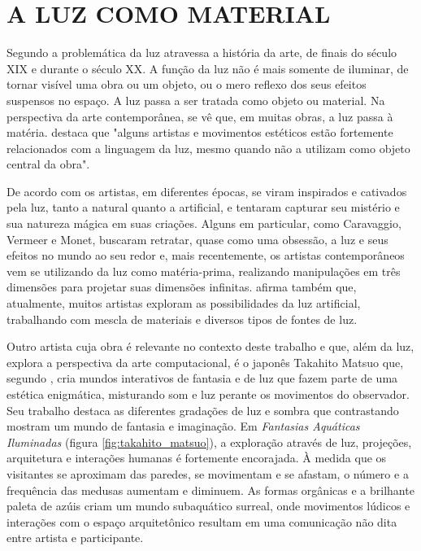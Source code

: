 \chapter{A LUZ COMO MATERIAL}

Segundo  a problemática da luz atravessa a história da arte, de finais do século XIX e durante o século XX. A função da luz não é mais somente de iluminar, de tornar visível uma obra ou um objeto, ou o mero reflexo dos seus efeitos suspensos no espaço. A luz passa a ser tratada como objeto ou material. Na perspectiva da arte contemporânea, se vê que, em muitas obras, a luz passa à matéria.  destaca que "alguns artistas e movimentos estéticos estão fortemente relacionados com a linguagem da luz, mesmo quando não a utilizam como objeto central da obra". 

De acordo com  os artistas, em diferentes épocas, se viram inspirados e cativados pela luz, tanto a natural quanto a artificial, e tentaram capturar seu mistério e sua natureza mágica em suas criações. Alguns em particular, como Caravaggio, Vermeer e Monet, buscaram retratar, quase como uma obsessão, a luz e seus efeitos no mundo ao seu redor e, mais recentemente, os artistas contemporâneos vem se utilizando da luz como matéria-prima, realizando manipulações em três dimensões para projetar suas dimensões infinitas.  afirma também que, atualmente, muitos artistas exploram as possibilidades da luz artificial, trabalhando com mescla de materiais e diversos tipos de fontes de luz. 

Outro artista cuja obra é relevante no contexto deste trabalho e que, além da luz, explora a perspectiva da arte computacional, é o japonês Takahito Matsuo que, segundo , cria mundos interativos de fantasia e de luz que fazem parte de uma estética enigmática, misturando som e luz perante os movimentos do observador. Seu trabalho destaca as diferentes gradações de luz e sombra que contrastando mostram um mundo de fantasia e imaginação. Em \textit{Fantasias Aquáticas Iluminadas} (figura \ref{fig:takahito_matsuo}), a exploração através de luz, projeções, arquitetura e interações humanas é fortemente encorajada. À medida que os visitantes se aproximam das paredes, se movimentam e se afastam, o número e a frequência das medusas aumentam e diminuem. As formas orgânicas e a brilhante paleta de azúis criam um mundo subaquático surreal, onde movimentos lúdicos e interações com o espaço arquitetônico resultam em uma comunicação não dita entre artista e participante. 

